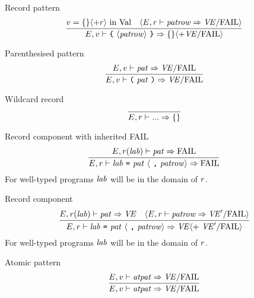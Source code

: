 \begin{inference-rule}{Record pattern}
\begin{equation}\label{rule:dynamic-core:record-pattern}
\vcenter{\infer{\E,\V\ts\lttbrace\ \optional{\labpats}\ \rttbrace\ra\emptymap\optional{+\VE/\fail}}
    {\V=\emptymap\optional{+\r}\ \In\ \Val
      & \optional{\E,\r\ts\labpats\ra\VE/\fail}}}
\end{equation}
\end{inference-rule}

\begin{inference-rule}{Parenthesised pattern}
\begin{equation}\label{rule:dynamic-core:parenthesised-pattern}
\vcenter{\infer{\E,\V\ts\parpat\ra\VE/\fail}
  {\E,\V\ts\pat\ra\VE/\fail}}
\end{equation}
\end{inference-rule}


\begin{inference-rule}{Wildcard record}
\begin{equation}\label{rule:dynamic-core:wildcard-record}
\vcenter{\infer{\E,\r\ts\wildrec\ra\emptymap}
  {}}
\end{equation}
\end{inference-rule}

\begin{inference-rule}{Record component with inherited FAIL}
\begin{equation}\label{rule:dynamic-core:longlab-dyn-rule1}
\vcenter{\infer{\E,\r\ts\longlabpats\ra\FAIL}
  {\E,\r(\lab)\ts\pat\ra\FAIL}}
\end{equation}
For well-typed programs $\textit{lab\/}$ will be in the domain of $r$.
\end{inference-rule}

\begin{inference-rule}{Record component}
\begin{equation}\label{rule:dynamic-core:record-component}
\vcenter{\infer{\E,\r\ts\longlabpats\ra
    \VE\optional{ +\ \VE'/\fail}}
  {\E,\r(\lab)\ts\pat\ra\VE
    & \optional{\E,\r\ts\labpats\ra\VE'/\fail} }}
\end{equation}
For well-typed programs $\textit{lab\/}$ will be in the domain of $r$.
\end{inference-rule}


\begin{inference-rule}{Atomic pattern}
\begin{equation}\label{rule:dynamic-core:atomic-pattern}
\vcenter{\infer{\E,\V\ts\atpat\ra \VE/\fail}
  {\E,\V\ts\atpat\ra \VE/\fail}}
\end{equation}
\end{inference-rule}

